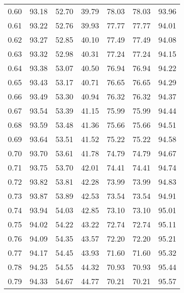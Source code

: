 \begin{tabular}{|c|c|c|c|c|c|c|}
      0.60 &     93.18 &     52.70 &      39.79 &   78.03 &      78.03 &         93.96 \\
      0.61 &     93.22 &     52.76 &      39.93 &   77.77 &      77.77 &         94.01 \\
      0.62 &     93.27 &     52.85 &      40.10 &   77.49 &      77.49 &         94.08 \\
      0.63 &     93.32 &     52.98 &      40.31 &   77.24 &      77.24 &         94.15 \\
      0.64 &     93.38 &     53.07 &      40.50 &   76.94 &      76.94 &         94.22 \\
      0.65 &     93.43 &     53.17 &      40.71 &   76.65 &      76.65 &         94.29 \\
      0.66 &     93.49 &     53.30 &      40.94 &   76.32 &      76.32 &         94.37 \\
      0.67 &     93.54 &     53.39 &      41.15 &   75.99 &      75.99 &         94.44 \\
      0.68 &     93.59 &     53.48 &      41.36 &   75.66 &      75.66 &         94.51 \\
      0.69 &     93.64 &     53.51 &      41.52 &   75.22 &      75.22 &         94.58 \\
      0.70 &     93.70 &     53.61 &      41.78 &   74.79 &      74.79 &         94.67 \\
      0.71 &     93.75 &     53.70 &      42.01 &   74.41 &      74.41 &         94.74 \\
      0.72 &     93.82 &     53.81 &      42.28 &   73.99 &      73.99 &         94.83 \\
      0.73 &     93.87 &     53.89 &      42.53 &   73.54 &      73.54 &         94.91 \\
      0.74 &     93.94 &     54.03 &      42.85 &   73.10 &      73.10 &         95.01 \\
      0.75 &     94.02 &     54.22 &      43.22 &   72.74 &      72.74 &         95.11 \\
      0.76 &     94.09 &     54.35 &      43.57 &   72.20 &      72.20 &         95.21 \\
      0.77 &     94.17 &     54.45 &      43.93 &   71.60 &      71.60 &         95.32 \\
      0.78 &     94.25 &     54.55 &      44.32 &   70.93 &      70.93 &         95.44 \\
      0.79 &     94.33 &     54.67 &      44.77 &   70.21 &      70.21 &         95.57 \\

\end{tabular}
